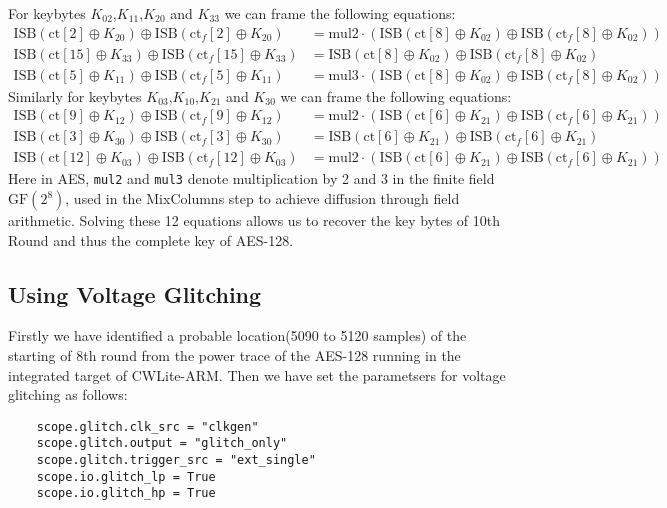 For keybytes $K_{02}$,$K_{11}$,$K_{20}$ and $K_{33}$ we can frame the following equations:
\begin{align*}
    \text{ISB}(\text{ct}[2] \oplus K_{20}) \oplus \text{ISB}(\text{ct}_f[2] \oplus K_{20}) &= \text{mul2} \cdot \left( \text{ISB}(\text{ct}[8] \oplus K_{02}) \oplus \text{ISB}(\text{ct}_f[8] \oplus K_{02}) \right) \\
    \text{ISB}(\text{ct}[15] \oplus K_{33}) \oplus \text{ISB}(\text{ct}_f[15] \oplus K_{33}) &= \text{ISB}(\text{ct}[8] \oplus K_{02}) \oplus \text{ISB}(\text{ct}_f[8] \oplus K_{02}) \\
    \text{ISB}(\text{ct}[5] \oplus K_{11}) \oplus \text{ISB}(\text{ct}_f[5] \oplus K_{11}) &= \text{mul3}\cdot \left( \text{ISB}(\text{ct}[8] \oplus K_{02}) \oplus \text{ISB}(\text{ct}_f[8] \oplus K_{02}) \right)
    \end{align*}
Similarly for keybytes $K_{03}$,$K_{10}$,$K_{21}$ and $K_{30}$ we can frame the following equations:
\begin{align*}
    \text{ISB}(\text{ct}[9] \oplus K_{12}) \oplus \text{ISB}(\text{ct}_f[9] \oplus K_{12}) &= \text{mul2} \cdot \left( \text{ISB}(\text{ct}[6] \oplus K_{21}) \oplus \text{ISB}(\text{ct}_f[6] \oplus K_{21}) \right) \\
    \text{ISB}(\text{ct}[3] \oplus K_{30}) \oplus \text{ISB}(\text{ct}_f[3] \oplus K_{30}) &= \text{ISB}(\text{ct}[6] \oplus K_{21}) \oplus \text{ISB}(\text{ct}_f[6] \oplus K_{21}) \\
    \text{ISB}(\text{ct}[12] \oplus K_{03}) \oplus \text{ISB}(\text{ct}_f[12] \oplus K_{03}) &= \text{mul2} \cdot \left( \text{ISB}(\text{ct}[6] \oplus K_{21}) \oplus \text{ISB}(\text{ct}_f[6] \oplus K_{21}) \right)
    \end{align*}
Here in AES, \texttt{mul2} and \texttt{mul3} denote multiplication by 2 and 3 in the finite field $\mathrm{GF}(2^8)$, used in the MixColumns step to achieve diffusion through field arithmetic. Solving these 12 equations allows us to recover the key bytes of 10th Round and thus the complete key of AES-128.
\subsection{Using Voltage Glitching}
Firstly we have identified a probable location(5090 to 5120 samples) of the starting of 8th round from the power trace of the AES-128 running in the integrated target of CWLite-ARM. Then we have set the parametsers for voltage glitching as follows:
\begin{verbatim}
    scope.glitch.clk_src = "clkgen"
    scope.glitch.output = "glitch_only" 
    scope.glitch.trigger_src = "ext_single"
    scope.io.glitch_lp = True
    scope.io.glitch_hp = True
\end{verbatim}
